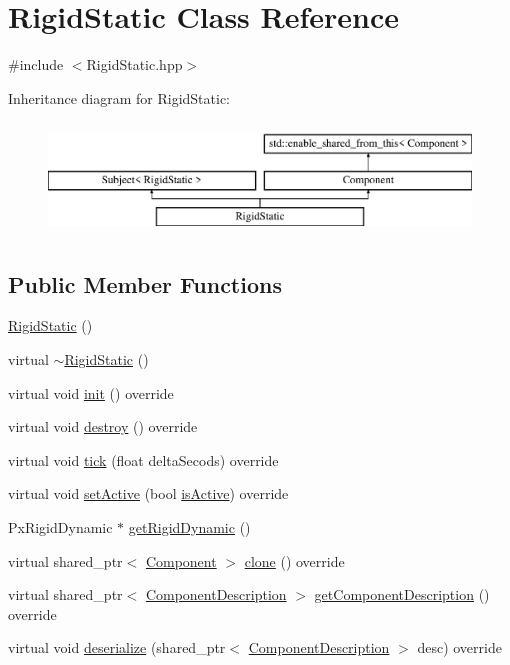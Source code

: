 \hypertarget{class_rigid_static}{}\section{Rigid\+Static Class Reference}
\label{class_rigid_static}


{\ttfamily \#include $<$Rigid\+Static.\+hpp$>$}

Inheritance diagram for Rigid\+Static\+:\begin{figure}[H]
\begin{center}
\leavevmode
\includegraphics[height=3.000000cm]{class_rigid_static}
\end{center}
\end{figure}
\subsection*{Public Member Functions}
\begin{DoxyCompactItemize}
\item 
\hyperlink{class_rigid_static_ae2a704e78025e8b938939153b24c5548}{Rigid\+Static} ()
\item 
virtual \hyperlink{class_rigid_static_a66a806674d933319ab77d39315a998b5}{$\sim$\+Rigid\+Static} ()
\item 
virtual void \hyperlink{class_rigid_static_a2844109f1ef8fe36a25ce065934d703c}{init} () override
\item 
virtual void \hyperlink{class_rigid_static_abd99e84cc884043d5afde1b95fb0d3b3}{destroy} () override
\item 
virtual void \hyperlink{class_rigid_static_a3eef6474e9396db05dc714e41154e793}{tick} (float delta\+Secods) override
\item 
virtual void \hyperlink{class_rigid_static_a439d621f3b44b8da9fc17faf88635267}{set\+Active} (bool \hyperlink{class_component_a6dad4f819c0814eee8219e9b391cf583}{is\+Active}) override
\item 
Px\+Rigid\+Dynamic $\ast$ \hyperlink{class_rigid_static_ab7734d16020ce18dee3c96a2010fa7b8}{get\+Rigid\+Dynamic} ()
\item 
virtual shared\+\_\+ptr$<$ \hyperlink{class_component}{Component} $>$ \hyperlink{class_rigid_static_a5fef27a8ca3f6e969fb4c8312c1bba0a}{clone} () override
\item 
virtual shared\+\_\+ptr$<$ \hyperlink{class_component_description}{Component\+Description} $>$ \hyperlink{group__serialization__functions_ga74f14a6073ed781cc12f42c0a936515a}{get\+Component\+Description} () override
\item 
virtual void \hyperlink{group__serialization__functions_ga80ddd737e7b8b80a997a0c6681925a26}{deserialize} (shared\+\_\+ptr$<$ \hyperlink{class_component_description}{Component\+Description} $>$ desc) override
\end{DoxyCompactItemize}
